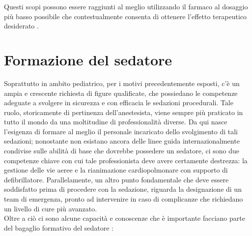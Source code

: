 Questi scopi possono essere raggiunti al meglio utilizzando il farmaco al dosaggio più basso possibile che contestualmente consenta di ottenere l'effetto terapeutico desiderato \cite{Guidelines2019}.

\section{Formazione del sedatore}

Soprattutto in ambito pediatrico, per i motivi precedentemente esposti, c'è un ampia e crescente richiesta di figure qualificate, che possiedano le competenze adeguate a svolgere in sicurezza e con efficacia le sedazioni procedurali. Tale ruolo, storicamente di pertinenza dell'anestesista, viene sempre più praticato in tutto il mondo da una moltitudine di professionalità diverse. Da qui nasce l'esigenza di formare al meglio il personale incaricato dello svolgimento di tali sedazioni; nonostante non esistano ancora delle linee guida internazionalmente condivise sulle abilità di base che dovrebbe possedere un sedatore, ci sono due competenze chiave con cui tale professionista deve avere certamente destrezza: la gestione delle vie aeree e la rianimazione cardiopolmonare con supporto di defibrillatore. Parallelamente, un altro punto fondamentale che deve essere soddisfatto prima di procedere con la sedazione, riguarda la designazione di un team di emergenza, pronto ad intervenire in caso di complicanze che richiedano un livello di cure più avanzato.
\\Oltre a ciò ci sono alcune capacità e conoscenze che è importante facciano parte del bagaglio formativo del sedatore \cite{Simeupsedazione, Berkenbosch2015}: 
